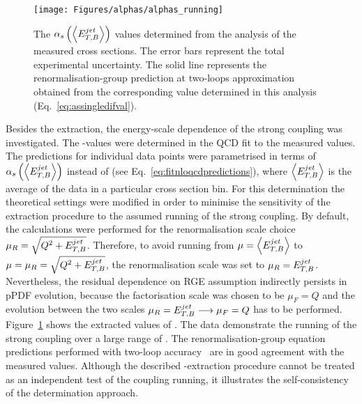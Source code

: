\begin{figure}[t!]
 \centering
 \texttt{[image: Figures/alphas/alphas\_running]}
 \caption{The $\mbox{$\alpha_{s}$}\left(\left<\mbox{$E_{T,B}^{jet}$}\right>\right)$ values determined from the analysis of the measured \dsdetjetb cross sections. The error bars represent the total experimental uncertainty. The solid line represents the renormalisation-group prediction at two-loops approximation obtained from the corresponding \asz value determined in this analysis (Eq.~\eqref{eq:assingledifval}).}
 \label{fig:asrunning}
\end{figure}
Besides the \asz extraction, the energy-scale dependence of the strong coupling was investigated. The \as-values were determined in the QCD fit to the measured \dsdetjetb values. The predictions for individual \dsdetjetb data points were parametrised in terms of $\mbox{$\alpha_{s}$}\left(\left<\mbox{$E_{T,B}^{jet}$}\right>\right)$ instead of \asz (see Eq.~\eqref{eq:fitnloqcdpredictions}), where $\left<\mbox{$E_{T,B}^{jet}$}\right>$ is the average \etjetb of the data in a particular cross section bin. For this determination the theoretical settings were modified in order to minimise the sensitivity of the extraction procedure to the assumed running of the strong coupling. By default, the calculations were performed for the renormalisation scale choice $\mu_R=\sqrt{\mbox{${Q^2}$}+\mbox{$E_{T,B}^{jet}$}}$. Therefore, to avoid running from $\mu=\left<\mbox{$E_{T,B}^{jet}$}\right>$ to $\mu=\mu_R=\sqrt{\mbox{${Q^2}$}+\mbox{$E_{T,B}^{jet}$}}$, the renormalisation scale was set to $\mu_R=\mbox{$E_{T,B}^{jet}$}$. Nevertheless, the residual dependence on RGE assumption indirectly persists in pPDF evolution, because the factorisation scale was chosen to be $\mu_F=Q$ and the evolution between the two scales $\mu_R = \mbox{$E_{T,B}^{jet}$} \longrightarrow \mu_F = Q$ has to be performed. Figure~\ref{fig:asrunning} shows the extracted values of \as. The data demonstrate the running of the strong coupling over a large range of \etjetb. The renormalisation-group equation predictions performed with two-loop accuracy~\cite{Gross:1973id, Politzer:1973fx, Gross:1973ju, Politzer:1974fr} are in good agreement with the measured values. Although the described \as-extraction procedure cannot be treated as an independent test of the coupling running, it illustrates the self-consistency of the \as determination approach.


